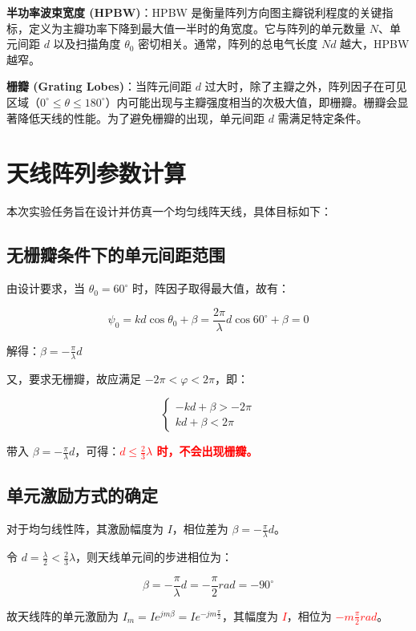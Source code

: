 \documentclass[12pt,a4paper,UTF8]{article}
\begin{document}
\textbf{半功率波束宽度 (HPBW)}：HPBW 是衡量阵列方向图主瓣锐利程度的关键指标，定义为主瓣功率下降到最大值一半时的角宽度。它与阵列的单元数量 $N$、单元间距 $d$ 以及扫描角度 $\theta_0$ 密切相关。通常，阵列的总电气长度 $Nd$ 越大，HPBW 越窄。

\textbf{栅瓣 (Grating Lobes)}：当阵元间距 $d$ 过大时，除了主瓣之外，阵列因子在可见区域（$0^\circ \le \theta \le 180^\circ$）内可能出现与主瓣强度相当的次极大值，即栅瓣。栅瓣会显著降低天线的性能。为了避免栅瓣的出现，单元间距 $d$ 需满足特定条件。

\section{天线阵列参数计算}

本次实验任务旨在设计并仿真一个均匀线阵天线，具体目标如下：

\subsection{无栅瓣条件下的单元间距范围}

由设计要求，当 $\theta_0 = 60^\circ$ 时，阵因子取得最大值，故有：

$$\psi_0 = kd \cos \theta_0 + \beta = \frac{2\pi}{\lambda} d \cos 60^\circ + \beta = 0$$

解得：$\beta = -\frac{\pi}{\lambda}d$

又，要求无栅瓣，故应满足 $-2\pi < \varphi < 2\pi$，即：

$$\begin{cases}
-kd + \beta > -2\pi \\
kd + \beta < 2\pi
\end{cases}$$

带入 $\beta = -\frac{\pi}{\lambda}d$，可得：\textcolor{red}{\textbf{$d \leq \frac{2}{3}\lambda$ 时，不会出现栅瓣。}}

\subsection{单元激励方式的确定}

对于均匀线性阵，其激励幅度为 $I$，相位差为 $\beta = -\frac{\pi}{\lambda}d$。

令 $d = \frac{\lambda}{2} < \frac{2}{3}\lambda$，则天线单元间的步进相位为：

$$\beta = -\frac{\pi}{\lambda}d = -\frac{\pi}{2}rad = -90^\circ$$

故天线阵的单元激励为 $I_m = Ie^{jm\beta} = Ie^{-jm\frac{\pi}{2}}$，其幅度为 \textcolor{red}{$I$}，相位为 \textcolor{red}{\textbf{$-m\frac{\pi}{2}rad$}}。
\end{document}
